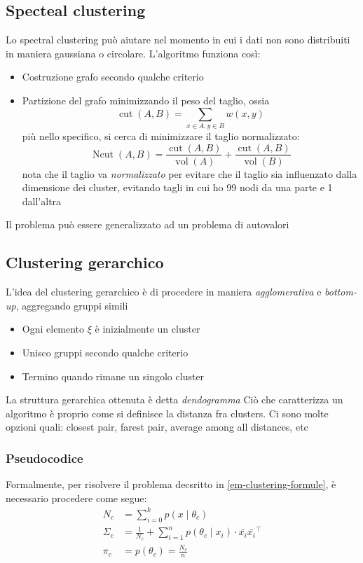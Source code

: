 \subsection{Specteal clustering}
Lo spectral clustering può aiutare nel momento in cui i dati non sono distribuiti in maniera gaussiana o circolare. L'algoritmo funziona così:
\begin{itemize}
	\item Costruzione grafo secondo qualche criterio
	\item Partizione del grafo minimizzando il peso del taglio, ossia
	      \[
		      \operatorname{cut}\left(A, B\right) = \sum_{x \in A, y \in B} w\left(x,y\right)
	      \]
	      più nello specifico, si cerca di minimizzare il taglio normalizzato:
	      \[
		      \operatorname{Ncut}\left(A,B\right) = \frac{\operatorname{cut}\left(A,B\right)}{\operatorname{vol}\left(A\right)} + \frac{\operatorname{cut}\left(A,B\right)}{\operatorname{vol}\left(B\right)}
	      \]
	      nota che il taglio va \textit{normalizzato} per evitare che il taglio sia influenzato dalla dimensione dei cluster, evitando tagli in cui ho 99 nodi da una parte e 1 dall'altra
\end{itemize}
Il problema può essere generalizzato ad un problema di autovalori

\subsection{Clustering gerarchico}
L'idea del clustering gerarchico è di procedere in maniera \textit{agglomerativa} e \textit{bottom-up}, aggregando gruppi simili
\begin{itemize}
	\item Ogni elemento $ \xi  $ è inizialmente un cluster
	\item Unisco gruppi secondo qualche criterio
	\item Termino quando rimane un singolo cluster
\end{itemize}
La struttura gerarchica ottenuta è detta \textit{dendogramma}
\vskip3mm
Ciò che caratterizza un algoritmo è proprio come si definisce la distanza fra clusters. Ci sono molte opzioni quali: closest pair, farest pair, average among all distances, etc


\subsubsection{Pseudocodice}
Formalmente, per risolvere il problema decsritto in \cref{em-clustering-formule}, è necessario procedere come segue:
\begin{align*}
	N_c      & = \sum_{i = 0}^{k} p\left(x \mid \theta_c\right)                                                  \\
	\Sigma_c & = \frac{1}{N_c} + \sum_{i=1}^{n} p\left(\theta_c \mid x_i\right) \cdot \bar{x_i} \bar{x_i}^{\top} \\
	\pi_c    & = p\left(\theta_c\right)  = \frac{N_c}{n}
\end{align*}

